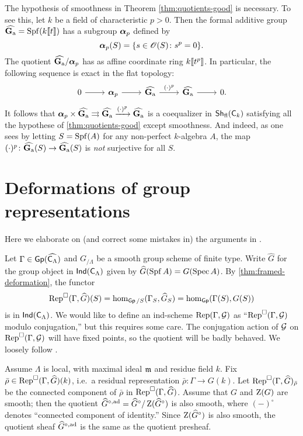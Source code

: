 \begin{example}
The hypothesis of smoothness in Theorem \ref{thm:quotients-good} is necessary. 
To see this, let $k$ be a field of characteristic $p>0$. Then the formal 
additive group $\widehat{\mathbf{G}_\mathrm{a}}=\operatorname{Spf}(k\llbracket t \rrbracket)$ has a subgroup ${\boldsymbol\alpha}_p$ defined 
by 
\[
  {\boldsymbol\alpha}_p(S) = \{s\in \mathscr{O}(S)\colon s^p=0\} .
\]
The quotient $\widehat{\mathbf{G}_\mathrm{a}}/{\boldsymbol\alpha}_p$ has as affine coordinate ring 
$k\llbracket t^p \rrbracket$. In particular, the following sequence is exact in the flat 
topology:
\[
\begin{tikzcd}
	0 \ar[r]
		& \balpha_p \ar[r]
		& \widehat\Ga \ar[r, "(\cdot)^p"]
		& \widehat\Ga \ar[r]
		& 0 .
\end{tikzcd}
\]
It follows that 
${\boldsymbol\alpha}_p\times \widehat{\mathbf{G}_\mathrm{a}}\rightrightarrows\widehat{\mathbf{G}_\mathrm{a}}\xrightarrow{(\cdot)^p} \widehat{\mathbf{G}_\mathrm{a}}$
is a coequalizer in $\operatorname{\mathsf{Sh}}_{\mathrm{fl}}(\mathsf{C}_k)$ satisfying all the hypothese 
of \ref{thm:quotients-good} except smoothness. And indeed, as one sees by 
letting $S=\operatorname{Spf}(A)$ for any non-perfect $k$-algebra $A$, the map 
$(\cdot)^p\colon \widehat{\mathbf{G}_\mathrm{a}}(S)\to \widehat{\mathbf{G}_\mathrm{a}}(S)$ is \emph{not} surjective for 
all $S$. 
\end{example}





\section{Deformations of group representations}

Here we elaborate on (and correct some mistakes in) the arguments in 
\cite[\S 2.1]{bockle-2013}. 

Let $\Gamma\in \operatorname{\mathsf{Gp}}(\widehat{\mathsf{C}_\Lambda})$ and $G_{/\Lambda}$ be a smooth 
group scheme of finite type. Write $\widehat G$ for the group object in 
$\operatorname{\mathsf{Ind}}(\mathsf{C}_\Lambda)$ given by $\widehat G(\operatorname{Spf} A) = G(\operatorname{Spec} A)$. By 
\ref{thm:framed-deformation}, the functor 
\[
  \operatorname{Rep}^\square(\Gamma,\widehat G)(S) = \hom_{\operatorname{\mathsf{Gp}}/S}(\Gamma_S,\widehat G_S) = \hom_{\operatorname{\mathsf{Gp}}}(\Gamma(S), G(S)) 
\]
is in $\operatorname{\mathsf{Ind}}(\mathsf{C}_\Lambda)$. We would like to define an ind-scheme 
$\operatorname{Rep}(\Gamma,\mathcal{G})$ as ``$\operatorname{Rep}^\square(\Gamma,\mathcal{G})$ modulo conjugation,'' but 
this requires some care. The conjugation action of $\mathcal{G}$ on 
$\operatorname{Rep}^\square(\Gamma,\mathcal{G})$ will have fixed points, so the quotient will be 
badly behaved. We loosely follow \cite[Ch.~2--3]{tilouine-1996}. 

Assume $\Lambda$ is local, with maximal ideal $\mathfrak{m}$ and residue field $k$. 
Fix $\bar\rho\in \operatorname{Rep}^\square(\Gamma,\widehat G)(k)$, i.e.~a residual 
representation $\bar\rho\colon \Gamma\to G(k)$. Let 
$\operatorname{Rep}^\square(\Gamma,\widehat G)_{\bar\rho}$ be the connected component of 
$\bar\rho$ in $\operatorname{Rep}^\square(\Gamma,\widehat G)$. Assume 
that $G$ and $\operatorname{Z}(G)$ are smooth; then the quotient 
$\widehat{G}^{\circ,\mathrm{ad}}=\widehat G^\circ/\operatorname{Z}(\widehat G^\circ)$ is also 
smooth, where $(-)^\circ$ denotes ``connected component of identity.'' 
Since $\operatorname{Z}(\widehat G^\circ)$ is also smooth, the quotient sheaf 
$\widehat G^{\circ,\mathrm{ad}}$ is the same as the quotient presheaf. 

